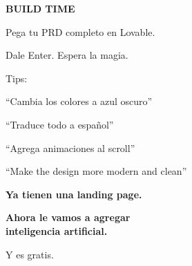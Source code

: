 \documentclass[aspectratio=169]{beamer}
\begin{document}
\begin{frame}[plain]
\begin{center}
\vspace{1.5cm}
{\fontsize{36}{40}\selectfont\bfseries\color{accent} BUILD TIME}

\vspace{0.5cm}
{\fontsize{18}{22}\selectfont\color{textwhite} Pega tu PRD completo en Lovable.}

\vspace{0.3cm}
{\fontsize{18}{22}\selectfont\color{textwhite} Dale Enter. Espera la magia.}

\vspace{1.2cm}

{\color{textgray}\large Tips:}

\vspace{0.3cm}
{\color{accentlight} ``Cambia los colores a azul oscuro''}

\vspace{0.2cm}
{\color{accentlight} ``Traduce todo a espa\~nol''}

\vspace{0.2cm}
{\color{accentlight} ``Agrega animaciones al scroll''}

\vspace{0.2cm}
{\color{accentlight} ``Make the design more modern and clean''}
\end{center}
\end{frame}

\begin{frame}[plain]
\begin{center}
\vspace{2cm}
{\fontsize{28}{32}\selectfont\color{textwhite}\bfseries Ya tienen una landing page.}

\vspace{0.6cm}
{\fontsize{28}{32}\selectfont\color{accent}\bfseries Ahora le vamos a agregar\\[8pt] inteligencia artificial.}

\vspace{1.5cm}
{\fontsize{16}{20}\selectfont\color{textgray} Y es gratis.}
\end{center}
\end{frame}
\end{document}
